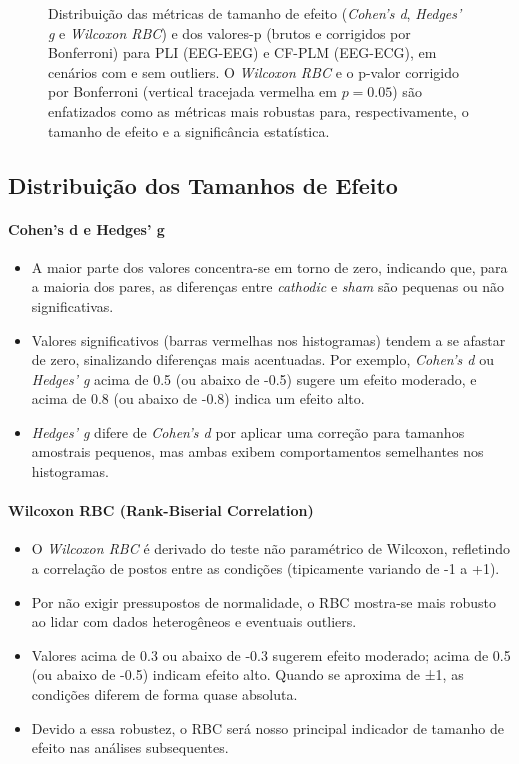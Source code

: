 \begin{figure}[htb]
{    }
    \caption[Distribuições de tamanhos de efeito e valores-p]{Distribuição das métricas de tamanho de efeito (\emph{Cohen's d}, \emph{Hedges' g} e \emph{Wilcoxon RBC}) e dos valores-p (brutos e corrigidos por Bonferroni) para PLI (EEG-EEG) e CF-PLM (EEG-ECG), em cenários com e sem outliers. O \emph{Wilcoxon RBC} e o p-valor corrigido por Bonferroni (vertical tracejada vermelha em $p=0.05$) são enfatizados como as métricas mais robustas para, respectivamente, o tamanho de efeito e a significância estatística.}
    \label{fig:effectsizehist_all}
\end{figure}

\subsection{Distribuição dos Tamanhos de Efeito}

\paragraph{Cohen's d e Hedges' g}
\begin{itemize}
    \item A maior parte dos valores concentra-se em torno de zero, indicando que, para a maioria dos pares, as diferenças entre \emph{cathodic} e \emph{sham} são pequenas ou não significativas.
    \item Valores significativos (barras vermelhas nos histogramas) tendem a se afastar de zero, sinalizando diferenças mais acentuadas. Por exemplo, \emph{Cohen's d} ou \emph{Hedges' g} acima de 0.5 (ou abaixo de -0.5) sugere um efeito moderado, e acima de 0.8 (ou abaixo de -0.8) indica um efeito alto.
    \item \emph{Hedges' g} difere de \emph{Cohen's d} por aplicar uma correção para tamanhos amostrais pequenos, mas ambas exibem comportamentos semelhantes nos histogramas.
\end{itemize}

\paragraph{Wilcoxon RBC (Rank-Biserial Correlation)}
\begin{itemize}
    \item O \emph{Wilcoxon RBC} é derivado do teste não paramétrico de Wilcoxon, refletindo a correlação de postos entre as condições (tipicamente variando de -1 a +1).
    \item Por não exigir pressupostos de normalidade, o RBC mostra-se mais robusto ao lidar com dados heterogêneos e eventuais outliers. 
    \item Valores acima de 0.3 ou abaixo de -0.3 sugerem efeito moderado; acima de 0.5 (ou abaixo de -0.5) indicam efeito alto. Quando se aproxima de ±1, as condições diferem de forma quase absoluta.
    \item Devido a essa robustez, o RBC será nosso principal indicador de tamanho de efeito nas análises subsequentes.
\end{itemize}


